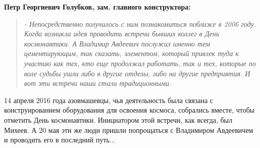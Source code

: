 \textbf{Петр Георгиевич Голубков, зам. главного конструктора:}

\begin{quote}
\em - Непосредственно получилось с ним познакомиться поближе в 2006 году. Когда
возникла идея проводить встречи бывших коллег в День космонавтики. А Владимир
Авдеевич послужил именно тем цементирующим, так сказать, элементом, который
привлек туда к участию как тех, кто еще продолжал работать, так и тех, которые
по воле судьбы ушли либо в другие отделы, либо на другие предприятия. И вот эти
встречи наши стали традиционными. 	
\end{quote}

14 апреля 2016 года азовмашевцы, чья деятельность была связана с
конструированием оборудования для освоения космоса, собрались вместе, чтобы
отметить День космонавтики. Инициатором этой встречи, как всегда, был Михеев. А
20 мая эти же люди пришли попрощаться с Владимиром Авдеевичем и проводить его в
последний путь...
